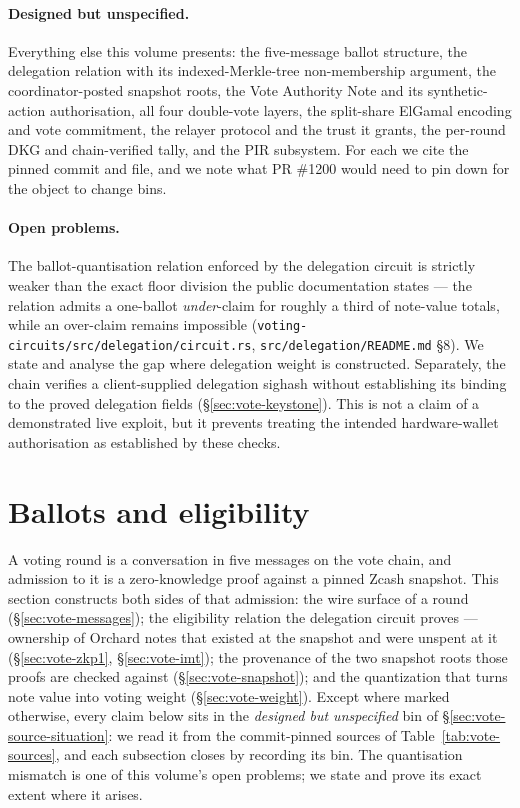 \documentclass[11pt,a4paper]{article}
\theoremstyle{definition}
\begin{document}
\paragraph{Designed but unspecified.} Everything else this volume presents:
the five-message ballot structure, the delegation relation with its
indexed-Merkle-tree non-membership argument, the coordinator-posted snapshot
roots, the Vote Authority Note and its synthetic-action authorisation, all
four double-vote layers, the split-share ElGamal encoding and vote
commitment, the relayer protocol and the trust it grants, the per-round DKG
and chain-verified tally, and the PIR subsystem. For each we cite the pinned
commit and file, and we note what PR \#1200 would need to pin down for the
object to change bins.

\paragraph{Open problems.} The
ballot-quantisation relation enforced by the delegation circuit is strictly
weaker than the exact floor division the public documentation states --- the
relation admits a one-ballot \emph{under}-claim for roughly a third of
note-value totals, while an over-claim remains impossible
(\texttt{voting-circuits/src/delegation/circuit.rs},
\texttt{src/delegation/README.md} \S8). We state and analyse the gap where
delegation weight is constructed. Separately, the chain verifies a
client-supplied delegation sighash without establishing its binding to
the proved delegation fields (\S\ref{sec:vote-keystone}). This is not a
claim of a demonstrated live exploit, but it prevents treating the
intended hardware-wallet authorisation as established by these checks.

\section{Ballots and eligibility}\label{sec:vote-ballot}

A voting round is a conversation in five messages on the vote chain, and
admission to it is a zero-knowledge proof against a pinned Zcash snapshot.
This section constructs both sides of that admission: the wire surface of a
round (\S\ref{sec:vote-messages}); the eligibility relation the delegation
circuit proves --- ownership of Orchard notes that existed at the snapshot
and were unspent at it (\S\ref{sec:vote-zkp1}, \S\ref{sec:vote-imt}); the
provenance of the two snapshot roots those proofs are checked against
(\S\ref{sec:vote-snapshot}); and the quantization that turns note value into
voting weight (\S\ref{sec:vote-weight}). Except where marked otherwise,
every claim below sits in the \emph{designed but unspecified} bin of
\S\ref{sec:vote-source-situation}: we read it from the commit-pinned sources
of Table~\ref{tab:vote-sources}, and each subsection closes by recording its
bin. The quantisation mismatch is one of this volume's open problems;
we state and prove its exact extent where it arises.
\end{document}
